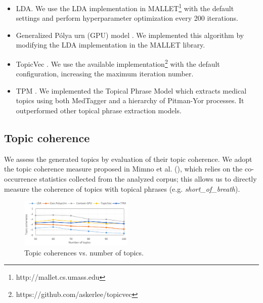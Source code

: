 \documentclass[letterpaper]{article}
\begin{document}
\begin{itemize}
    \item LDA. We use the LDA implementation in  MALLET\footnote{http://mallet.cs.umass.edu} with the default settings and perform hyperparameter optimization every 200 iterations. 
    \item Generalized P\'{o}lya urn (GPU) model \cite{Mimno11}. %
    We implemented this algorithm by modifying the LDA implementation in the MALLET library.
    \item TopicVec \cite{Li16}. %
    We use the available implementation\footnote{https://github.com/askerlee/topicvec} with the default configuration, increasing the maximum iteration number.
    \item TPM \cite{He16Med}. We implemented the Topical Phrase Model which extracts medical topics using both MedTagger and a hierarchy of Pitman-Yor processes. It outperformed other topical phrase extraction models. %
\end{itemize}







\subsection{Topic coherence}
We assess the generated topics by evaluation of their topic coherence. %
We adopt the topic coherence measure proposed in Mimno et al. (\citeyear{Mimno11}), which relies on the co-occurrence statistics collected from the analyzed corpus; this allows us to directly measure the coherence of topics with topical phrases (e.g. \textit{short\_of\_breath}). 

\begin{figure}[!ht]
  \centering
\includegraphics[width=0.48\textwidth]{model_coherences_croped.pdf}
\caption{Topic coherences vs. number of topics.}
\label{fig:coherences}
\end{figure}
\end{document}
